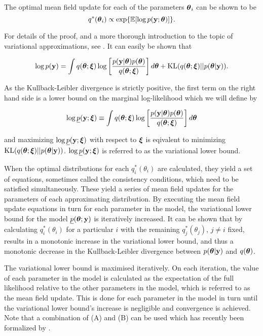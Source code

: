 The optimal mean field update for each of the parameters ${\boldsymbol \theta}_i$ can be shown to be
$$
	q^*({\boldsymbol \theta}_i) \propto \exp \{ \mathbb{E} [\log p({\bf y}; {\boldsymbol \theta})] \}.
$$

\noindent For details of the proof, and a more thorough introduction to the topic of variational
approximations, see \cite{Ormerod2010}. It can easily be shown that

$$
	\displaystyle \log p({\bf y}) = \int q({\boldsymbol \theta};{\boldsymbol \xi}) \log \left[ \frac{p({\bf y}|{\boldsymbol \theta})p({\boldsymbol \theta})}{q({\boldsymbol \theta};{\boldsymbol \xi})} \right] d{\boldsymbol \theta} + \text{KL}(q({\boldsymbol \theta};{\boldsymbol \xi})||p({\boldsymbol \theta}|{\bf y})).
$$

\noindent As the Kullback-Leibler divergence is strictly positive, the first term on the right hand side
is a lower bound on the marginal log-likelihood which we will define by

$$
	\displaystyle \log \underline{p}({\bf y};{\boldsymbol \xi}) \equiv \int q({\boldsymbol \theta};{\boldsymbol \xi})  \log \left[ \frac{p({\bf y}|{\boldsymbol \theta})p({\boldsymbol \theta})}{q({\boldsymbol \theta};{\boldsymbol \xi})} \right] d{\boldsymbol \theta}
$$

\noindent and maximizing $\log \underline{p}({\bf y};{\boldsymbol \xi})$ with respect to ${\boldsymbol \xi}$ is eqivalent to minimizing
$\text{KL}(q({\boldsymbol \theta};{\boldsymbol \xi})||p({\boldsymbol \theta}|{\bf y}))$. $\log \underline{p}({\bf y};{\boldsymbol \xi})$ is referred to as the
variational lower bound.

When the optimal distributions for each $q_i^*(\theta_i)$ are calculated, they yield a set of equations,
sometimes called the consistency conditions, which need to be  satisfied simultaneously. These yield a series
of mean field updates for the parameters of each approximating distribution. By executing the mean field
update equations in turn for each parameter in the model, the variational lower bound for the model
$\underline{p}({\boldsymbol \theta}; {\bf y})$ is iteratively increased. It can be shown that by calculating $q_i^*(\theta_i)$
for  a particular $i$ with the remaining $q_j^*(\theta_j)$, $j\ne i$ fixed, results in a monotonic increase in
the variational lower bound, and thus a monotonic decrease in the Kullback-Leibler divergence between
$p({\boldsymbol \theta}|{\bf y})$ and $q({\boldsymbol \theta})$.

The variational lower bound is maximised iteratively. On each iteration, the value of each parameter in the
model is calculated as the expectation of the full likelihood relative to the other parameters in the model,
which is referred to as the mean field update. This is done for each parameter in the model in turn until the
variational lower bound's increase is negligible and convergence is achieved. Note that a combination of (A)
and (B) can be used which has recently been formalized by \cite{Rohde2015}.

